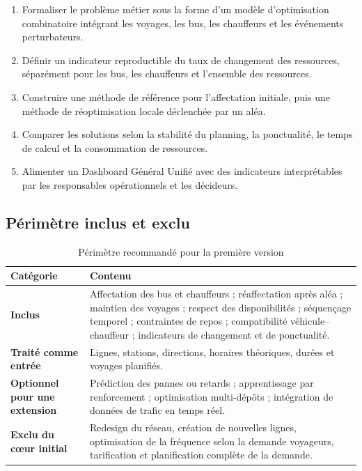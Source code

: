 \documentclass[12pt,a4paper]{article}
\begin{document}
\begin{enumerate}
\item Formaliser le problème métier sous la forme d’un modèle d’optimisation combinatoire intégrant les voyages, les bus, les chauffeurs et les événements perturbateurs.
\item Définir un indicateur reproductible du taux de changement des ressources, séparément pour les bus, les chauffeurs et l’ensemble des ressources.
\item Construire une méthode de référence pour l’affectation initiale, puis une méthode de réoptimisation locale déclenchée par un aléa.
\item Comparer les solutions selon la stabilité du planning, la ponctualité, le temps de calcul et la consommation de ressources.
\item Alimenter un Dashboard Général Unifié avec des indicateurs interprétables par les responsables opérationnels et les décideurs.
\end{enumerate}

\subsection{Périmètre inclus et exclu}

\begin{table}[ht]
\centering
\caption{Périmètre recommandé pour la première version}
\begin{tabularx}{\textwidth}{>{\bfseries}p{3cm} X}
\toprule
Catégorie & Contenu \\
\midrule
Inclus & Affectation des bus et chauffeurs ; réaffectation après aléa ; maintien des voyages ; respect des disponibilités ; séquençage temporel ; contraintes de repos ; compatibilité véhicule--chauffeur ; indicateurs de changement et de ponctualité. \\
Traité comme entrée & Lignes, stations, directions, horaires théoriques, durées et voyages planifiés. \\
Optionnel pour une extension & Prédiction des pannes ou retards ; apprentissage par renforcement ; optimisation multi-dépôts ; intégration de données de trafic en temps réel. \\
Exclu du cœur initial & Redesign du réseau, création de nouvelles lignes, optimisation de la fréquence selon la demande voyageurs, tarification et planification complète de la demande. \\
\bottomrule
\end{tabularx}
\end{table}
\end{document}
